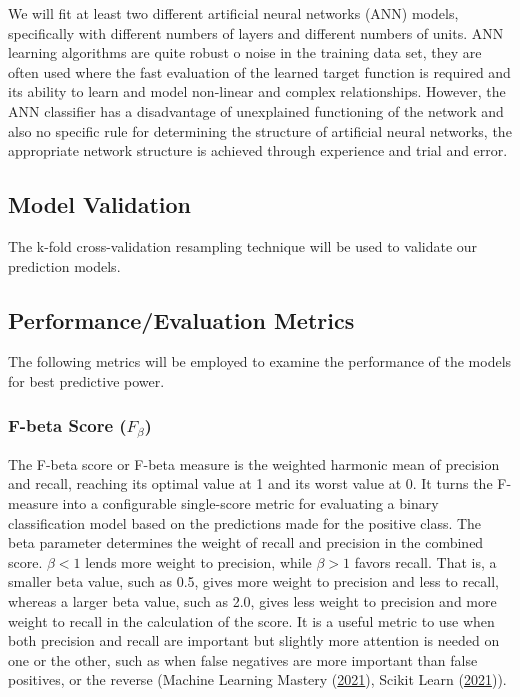 \documentclass[
  10pt,
]{article}
\begin{document}
We will fit at least two different artificial neural networks (ANN) models, specifically with different numbers of layers and different numbers of units. ANN learning algorithms are quite robust o noise in the training data set, they are often used where the fast evaluation of the learned target function is required and its ability to learn and model non-linear and complex relationships. However, the ANN classifier has a disadvantage of unexplained functioning of the network and also no specific rule for determining the structure of artificial neural networks, the appropriate network structure is achieved through experience and trial and error.

\hypertarget{model-validation}{%
\subsection{Model Validation}\label{model-validation}}

The k-fold cross-validation resampling technique will be used to validate our prediction models.

\hypertarget{performanceevaluation-metrics}{%
\subsection{Performance/Evaluation Metrics}\label{performanceevaluation-metrics}}

The following metrics will be employed to examine the performance of the models for best predictive power.

\hypertarget{f-beta-score-f_beta}{%
\subsubsection{\texorpdfstring{F-beta Score (\(F_\beta\))}{F-beta Score (F\_\textbackslash beta)}}\label{f-beta-score-f_beta}}

The F-beta score or F-beta measure is the weighted harmonic mean of precision and recall, reaching its optimal value at 1 and its worst value at 0. It turns the F-measure into a configurable single-score metric for evaluating a binary classification model based on the predictions made for the positive class. The beta parameter determines the weight of recall and precision in the combined score. \(\beta < 1\) lends more weight to precision, while \(\beta > 1\) favors recall. That is, a smaller beta value, such as 0.5, gives more weight to precision and less to recall, whereas a larger beta value, such as 2.0, gives less weight to precision and more weight to recall in the calculation of the score. It is a useful metric to use when both precision and recall are important but slightly more attention is needed on one or the other, such as when false negatives are more important than false positives, or the reverse (Machine Learning Mastery (\protect\hyperlink{ref-MLM}{2021}), Scikit Learn (\protect\hyperlink{ref-scikit_learn}{2021})).
\end{document}
